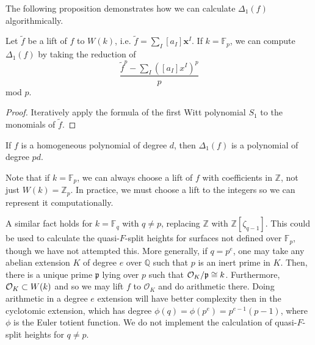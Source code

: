 The following proposition demonstrates how we can calculate 
\(\Delta_{1}(f)\) algorithmically.

\begin{prop}
	\label{prop:delta1:formula}
	Let \(\tilde{f}\) be a lift of \(f\) to \(W(k)\),
	i.e.
	\(\tilde{f} = \sum_{I}^{} [a_{I}] \mathbf{x}^{I}\).
	If \(k = \mathbb{F}_{p}\),
	we can compute \(\Delta_{1}(f)\) by 
	taking the reduction of
	\[
		\frac{\tilde{f}^{p} - \sum_{I}^{} ([a_{I}]x^{I})^{p} }{p}
	\] 
	mod \(p\).
\end{prop}

\begin{proof}
	Iteratively apply the formula of the first
	Witt polynomial \(S_{1}\) 
	to the monomials of \(\tilde{f}\).
\end{proof}

\begin{rmk}
	If \(f\) is a homogeneous polynomial of degree \(d\), 
	then \(\Delta_{1}(f)\) is a polynomial of degree \(pd\).
\end{rmk}

\begin{rmk}
    \label{rmk:lift:roi}
    Note that if \(k = \mathbb{F}_{p}\), we can always choose a lift
    of \(f\) with coefficients in \(\mathbb{Z}\), 
    not just \(W(k) = \mathbb{Z}_{p}\).
    In practice, we must choose a lift to the integers
    so we can represent it computationally.

    A similar fact holds for \(k = \mathbb{F}_{q}\) with 
    \(q \neq p\), replacing \(\mathbb{Z}\) with
    \(\mathbb{Z}[\zeta_{q-1}]\).
    This could be used to calculate the quasi-\(F\)-split 
    heights for surfaces not defined over \(\mathbb{F}_{p}\),
    though we have not attempted this.
    More generally, if \(q = p^{e}\), one may take
    any abelian extension \(K\) of degree \(e\) over \(\mathbb{Q}\) such that
    \(p\) is an inert prime in \(K\).
    Then, there is a unique prime \(\mathfrak{p}\) lying over \(p\) 
    such that \(\mathcal{O}_{K} / \mathfrak{p} \cong k\).
    Furthermore, \(\mathcal{O}_{K} \subset W(k)\)
    and so we may lift \(f\) to \(\mathcal{O}_{K}\) 
    and do arithmetic there. 
    Doing arithmetic in a degree \(e\) extension will have
    better complexity then in the cyclotomic extension, which
    has degree \(\phi(q) = \phi(p^{e}) = p^{e-1}(p-1)\), where
    \(\phi\) is the Euler totient function.
    We do not implement the calculation of quasi-\(F\)-split
    heights for \(q \neq p\).
\end{rmk}



